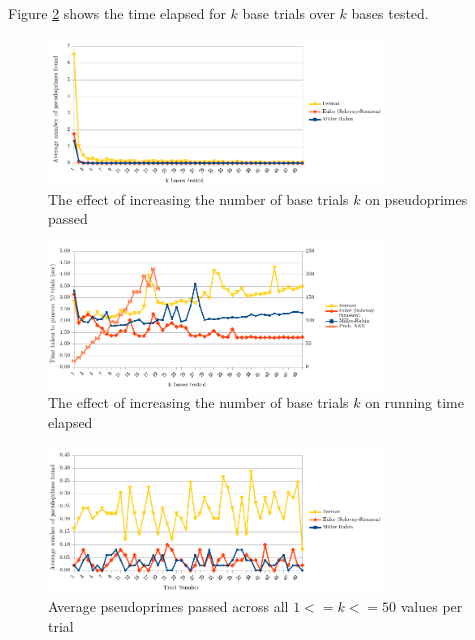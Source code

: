 \documentclass{article}
\begin{document}
Figure \ref{fig:time_v_bases} shows the time elapsed for $k$ base trials over $k$ bases tested.

\FloatBarrier
\begin{figure}[h!]
\label{fig:pprimes_v_bases}
\caption{The effect of increasing the number of base trials $k$ on pseudoprimes passed}
\centering
\includegraphics[width=0.8\textwidth]{pprimes_v_bases}
\end{figure}
\FloatBarrier

\FloatBarrier
\begin{figure}[h!]
\label{fig:time_v_bases}
\caption{The effect of increasing the number of base trials $k$ on running time elapsed}
\centering
\includegraphics[width=0.8\textwidth]{time_v_bases}
\end{figure}
\FloatBarrier

\FloatBarrier
\begin{figure}[h!]
\label{fig:pprimes_v_trial}
\caption{Average pseudoprimes passed across all $1 <= k <= 50$ values per trial}
\centering
\includegraphics[width=0.8\textwidth]{pprimes_v_trial}
\end{figure}
\FloatBarrier
\end{document}
